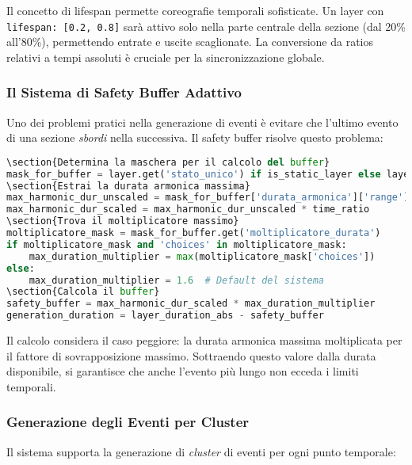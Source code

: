 Il concetto di lifespan permette coreografie temporali sofisticate. Un layer con \texttt{lifespan: [0.2, 0.8]} sarà attivo solo nella parte centrale della sezione (dal 20\% all'80\%), permettendo entrate e uscite scaglionate. La conversione da ratios relativi a tempi assoluti è cruciale per la sincronizzazione globale.
\subsubsection{Il Sistema di Safety Buffer Adattivo}
Uno dei problemi pratici nella generazione di eventi è evitare che l'ultimo evento di una sezione \textit{sbordi} nella successiva. Il safety buffer risolve questo problema:

\begin{lstlisting}[language=Python]
\section{Determina la maschera per il calcolo del buffer}
mask_for_buffer = layer.get('stato_unico') if is_static_layer else layer.get('stato_finale')
\section{Estrai la durata armonica massima}
max_harmonic_dur_unscaled = mask_for_buffer['durata_armonica']['range'][1]
max_harmonic_dur_scaled = max_harmonic_dur_unscaled * time_ratio
\section{Trova il moltiplicatore massimo}
moltiplicatore_mask = mask_for_buffer.get('moltiplicatore_durata')
if moltiplicatore_mask and 'choices' in moltiplicatore_mask:
    max_duration_multiplier = max(moltiplicatore_mask['choices'])
else:
    max_duration_multiplier = 1.6  # Default del sistema
\section{Calcola il buffer}
safety_buffer = max_harmonic_dur_scaled * max_duration_multiplier
generation_duration = layer_duration_abs - safety_buffer
\end{lstlisting}

Il calcolo considera il caso peggiore: la durata armonica massima moltiplicata per il fattore di sovrapposizione massimo. Sottraendo questo valore dalla durata disponibile, si garantisce che anche l'evento più lungo non ecceda i limiti temporali.
\subsubsection{Generazione degli Eventi per Cluster}
Il sistema supporta la generazione di \textit{cluster} di eventi per ogni punto temporale:

